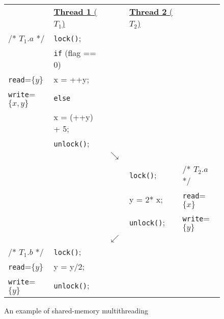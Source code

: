 \begin{figure}[t]
\centering
\myfontsize
{
\begin{tabular}
{m{1.5cm} m{2cm} m{0.1cm} m{1.8cm} m{1.2cm}}
&\underline{{\bf Thread 1} ($T_1$)} & & \underline{ {\bf Thread 2}  ($T_2$)} &\\


/* \underline{$T_{1}.a$} */ & {\tt lock()}; && &\\
& {\tt if} (flag == 0) && &\\
{\tt read}=$\{y\}$  & \hspace{3mm} x = ++y;&& &\\
{\tt write}=$\{x, y\}$  & {\tt else} && &\\
&\hspace{3mm}   x = (++y) + 5;&& &\\
  & {\tt unlock()};&& &\\
        &  &  $\searrow$ & & \\


&&  & {\tt lock()}; &  /* \underline{$T_{2}.a$ }*/\\
&&  & y = 2* x;    & {\tt read}=$\{x\}$  \\
&  &  & {\tt unlock()}; &  {\tt write}=$\{y\}$ \\

 &  &  $\swarrow$ & & \\

/* \underline{$T_{1}.b$} */ & {\tt lock()}; && &\\


{\tt read}=$\{y\}$  & y = y/2;&& &\\
{\tt write}=$\{ y\}$  & {\tt unlock()};  && &\\




\end{tabular}
}


\caption{ An example of shared-memory multithreading}
\label{fig:simple-example}
\end{figure}
